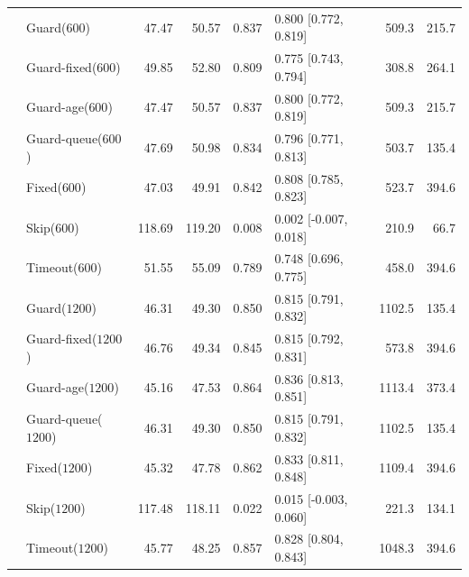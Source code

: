 \documentclass[mathematics,supfile,submit,moreauthors]{Definitions/mdpi}
\newcommand{\devnum}[1]{#1}
\begin{document}
\begin{table}[p]
\begin{tabular}{llrrrlrr}
 & Guard($\devnum{600}$)  & \devnum{47.47} & \devnum{50.57} & \devnum{0.837} & \devnum{0.800 [0.772, 0.819]} & \devnum{509.3} & \devnum{215.7} \\
 & Guard-fixed($\devnum{600}$) & \devnum{49.85} & \devnum{52.80} & \devnum{0.809} & \devnum{0.775 [0.743, 0.794]} & \devnum{308.8} & \devnum{264.1} \\
 & Guard-age($\devnum{600}$) & \devnum{47.47} & \devnum{50.57} & \devnum{0.837} & \devnum{0.800 [0.772, 0.819]} & \devnum{509.3} & \devnum{215.7} \\
 & Guard-queue($\devnum{600}$) & \devnum{47.69} & \devnum{50.98} & \devnum{0.834} & \devnum{0.796 [0.771, 0.813]} & \devnum{503.7} & \devnum{135.4} \\
 & Fixed($\devnum{600}$)  & \devnum{47.03} & \devnum{49.91} & \devnum{0.842} & \devnum{0.808 [0.785, 0.823]} & \devnum{523.7} & \devnum{394.6} \\
 & Skip($\devnum{600}$)   & \devnum{118.69} & \devnum{119.20} & \devnum{0.008} & \devnum{0.002 [-0.007, 0.018]} & \devnum{210.9} & \devnum{66.7} \\
 & Timeout($\devnum{600}$) & \devnum{51.55} & \devnum{55.09} & \devnum{0.789} & \devnum{0.748 [0.696, 0.775]} & \devnum{458.0} & \devnum{394.6} \\
 & Guard($\devnum{1200}$) & \devnum{46.31} & \devnum{49.30} & \devnum{0.850} & \devnum{0.815 [0.791, 0.832]} & \devnum{1102.5} & \devnum{135.4} \\
 & Guard-fixed($\devnum{1200}$) & \devnum{46.76} & \devnum{49.34} & \devnum{0.845} & \devnum{0.815 [0.792, 0.831]} & \devnum{573.8} & \devnum{394.6} \\
 & Guard-age($\devnum{1200}$) & \devnum{45.16} & \devnum{47.53} & \devnum{0.864} & \devnum{0.836 [0.813, 0.851]} & \devnum{1113.4} & \devnum{373.4} \\
 & Guard-queue($\devnum{1200}$) & \devnum{46.31} & \devnum{49.30} & \devnum{0.850} & \devnum{0.815 [0.791, 0.832]} & \devnum{1102.5} & \devnum{135.4} \\
 & Fixed($\devnum{1200}$) & \devnum{45.32} & \devnum{47.78} & \devnum{0.862} & \devnum{0.833 [0.811, 0.848]} & \devnum{1109.4} & \devnum{394.6} \\
 & Skip($\devnum{1200}$)  & \devnum{117.48} & \devnum{118.11} & \devnum{0.022} & \devnum{0.015 [-0.003, 0.060]} & \devnum{221.3} & \devnum{134.1} \\
 & Timeout($\devnum{1200}$) & \devnum{45.77} & \devnum{48.25} & \devnum{0.857} & \devnum{0.828 [0.804, 0.843]} & \devnum{1048.3} & \devnum{394.6} \\

\end{tabular}
\end{table}
\end{document}
